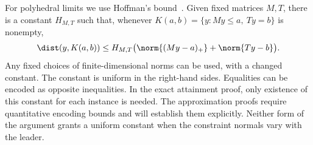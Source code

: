 For polyhedral limits we use Hoffman's bound~\cite{Hoffman1952}.
Given fixed matrices $M,T$, there is a constant $H_{M,T}$ such that,
whenever $K(a,b)=\{y:My\le a,\ Ty=b\}$ is nonempty,
\begin{equation}\label{eq:hoffman}
 \dist(y,K(a,b))\le H_{M,T}
          \bigl(\norm{(My-a)_+}+\norm{Ty-b}\bigr).
\end{equation}
Any fixed choices of finite-dimensional norms can be used, with a changed
constant. The constant is uniform in the right-hand sides. Equalities
can be encoded as opposite inequalities. In the exact attainment proof,
only existence of this constant for each instance is needed. The
approximation proofs require quantitative encoding bounds and will
establish them explicitly. Neither form of the argument grants a uniform
constant when the constraint normals vary with the leader.
